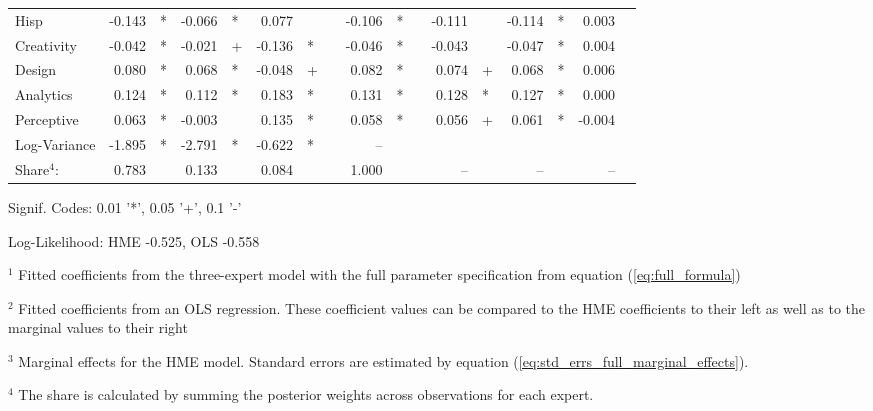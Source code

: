 \documentclass[12pt]{article}
\theoremstyle{definition}
\begin{document}
\begin{landscape}
\begin{table}
\begin{threeparttable}
\begin{tabular}[l]{l r l r l r l c r l c r l r l r l}
  Hisp                  & -0.143 & *      & -0.066 & *      &  0.077 &        && -0.106 & *     && -0.111 &          & -0.114 & *        &  0.003 &        \\
  Creativity            & -0.042 & *      & -0.021 & +      & -0.136 & *      && -0.046 & *     && -0.043 &          & -0.047 & *        &  0.004 &        \\
  Design                &  0.080 & *      &  0.068 & *      & -0.048 & +      &&  0.082 & *     &&  0.074 & +        &  0.068 & *        &  0.006 &        \\
  Analytics             &  0.124 & *      &  0.112 & *      &  0.183 & *      &&  0.131 & *     &&  0.128 & *        &  0.127 & *        &  0.000 &        \\
  Perceptive            &  0.063 & *      & -0.003 &        &  0.135 & *      &&  0.058 & *     &&  0.056 & +        &  0.061 & *        & -0.004 &        \\
  Log-Variance          & -1.895 & *      & -2.791 & *      & -0.622 & *      &&  --    &       &&  &          &  &          &  &        \\
  \cmidrule(l){2-3} \cmidrule(l){4-5} \cmidrule(l){6-7} \cmidrule(l){9-10} \cmidrule(l){12-13} \cmidrule(l){14-15} \cmidrule(l){16-17}
  Share$^{4}$:          & 0.783  &        & 0.133  &      & 0.084 &           &&  1.000 &       &&  --    &          &  --    &          &  --    &        \\
  \cmidrule{1-17}
        \end{tabular}
  
        \begin{tablenotes}
          \item Signif. Codes: 0.01 '*', 0.05 '+', 0.1 '-'
          \item Log-Likelihood: HME -0.525, OLS -0.558
          \item $^{1}$ Fitted coefficients from the three-expert model with the full parameter specification from equation (\ref{eq:full_formula})
          \item $^{2}$ Fitted coefficients from an OLS regression. These coefficient values can be compared to the HME coefficients to their left as well as to the marginal values to their right
          \item $^{3}$ Marginal effects for the HME model. Standard errors are estimated by equation (\ref{eq:std_errs_full_marginal_effects}).
          \item $^{4}$ The share is calculated by summing the posterior weights across observations for each expert.
  
        \end{tablenotes} \label{tbl:3D_full_regressions_results}
  
  
      \end{threeparttable}
  
  \end{table}
  \end{landscape}
\end{document}
